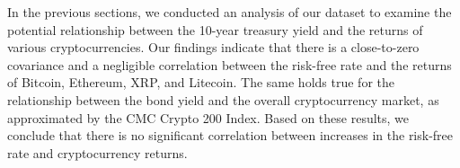 In the previous sections, we conducted an analysis of our dataset to examine the potential relationship between the 10-year treasury yield and the returns of various cryptocurrencies. Our findings indicate that there is a close-to-zero covariance and a negligible correlation between the risk-free rate and the returns of Bitcoin, Ethereum, XRP, and Litecoin. The same holds true for the relationship between the bond yield and the overall cryptocurrency market, as approximated by the CMC Crypto 200 Index. Based on these results, we conclude that there is no significant correlation between increases in the risk-free rate and cryptocurrency returns.
